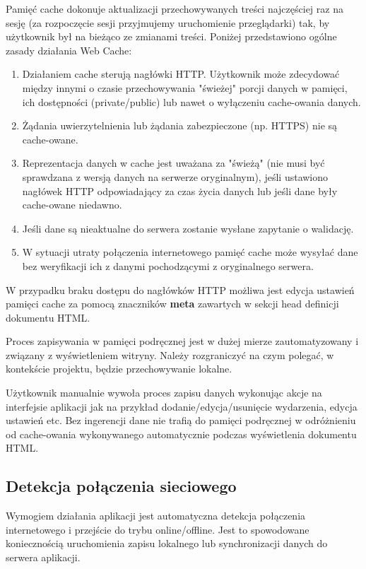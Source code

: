 Pamięć cache dokonuje aktualizacji przechowywanych treści najczęściej raz na sesję (za rozpoczęcie sesji przyjmujemy uruchomienie przeglądarki) tak, by użytkownik był na bieżąco ze zmianami treści. Poniżej przedstawiono ogólne zasady działania Web Cache\cite{cache}:

\begin{enumerate}
\item Działaniem cache sterują nagłówki HTTP. Użytkownik może zdecydować między innymi o czasie przechowywania "świeżej"{} porcji danych w pamięci, ich dostępności (private/public) lub nawet o wyłączeniu cache-owania danych.
\item Żądania uwierzytelnienia lub żądania zabezpieczone (np. HTTPS\cite{https}) nie są cache-owane.
\item Reprezentacja danych w cache jest uważana za "świeżą"{} (nie musi być sprawdzana z wersją danych na serwerze oryginalnym), jeśli ustawiono nagłówek HTTP odpowiadający za czas życia danych lub jeśli dane były cache-owane niedawno.
\item Jeśli dane są nieaktualne do serwera zostanie wysłane zapytanie o walidację.
\item W sytuacji utraty połączenia internetowego pamięć cache może wysyłać dane bez weryfikacji ich z danymi pochodzącymi z oryginalnego serwera.
\end{enumerate}

W przypadku braku dostępu do nagłówków HTTP możliwa jest edycja ustawień pamięci cache za pomocą znaczników \textbf{meta} zawartych w sekcji head definicji dokumentu HTML.

Proces zapisywania w pamięci podręcznej jest w dużej mierze zautomatyzowany i związany z wyświetleniem witryny. Należy rozgraniczyć na czym polegać, w kontekście projektu, będzie przechowywanie lokalne.

Użytkownik manualnie wywoła proces zapisu danych wykonując akcje na interfejsie aplikacji jak na przykład dodanie/edycja/usunięcie wydarzenia, edycja ustawień etc. Bez ingerencji dane nie trafią do pamięci podręcznej w odróżnieniu od cache-owania wykonywanego automatycznie podczas wyświetlenia dokumentu HTML.

\subsection{Detekcja połączenia sieciowego}
\label{sec:detPolSieciowego}

Wymogiem działania aplikacji jest automatyczna detekcja połączenia internetowego i przejście do trybu online/offline. Jest to spowodowane koniecznością uruchomienia zapisu lokalnego lub synchronizacji danych do serwera aplikacji.


